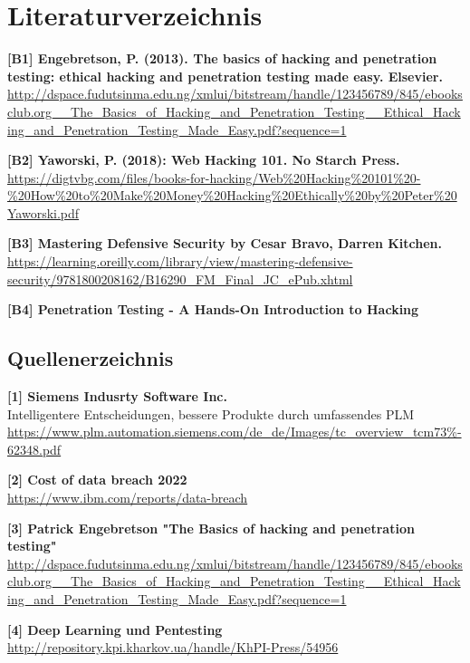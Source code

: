 \chapter{Literaturverzeichnis}

	\textbf{[B1] Engebretson, P. (2013).
	The basics of hacking and penetration testing: ethical hacking and penetration testing made easy. Elsevier.} \\
	\url{http://dspace.fudutsinma.edu.ng/xmlui/bitstream/handle/123456789/845/ebooksclub.org__The_Basics_of_Hacking_and_Penetration_Testing__Ethical_Hacking_and_Penetration_Testing_Made_Easy.pdf?sequence=1}
	
	
	\textbf{[B2] Yaworski, P. (2018): Web Hacking 101. No Starch Press.} \\
	\url{https://digtvbg.com/files/books-for-hacking/Web%20Hacking%20101%20-%20How%20to%20Make%20Money%20Hacking%20Ethically%20by%20Peter%20Yaworski.pdf}
	
	\textbf{[B3] Mastering Defensive Security by Cesar Bravo, Darren Kitchen.} \\
	\url{https://learning.oreilly.com/library/view/mastering-defensive-security/9781800208162/B16290_FM_Final_JC_ePub.xhtml}
	
	\textbf{[B4] Penetration Testing - A Hands-On Introduction to Hacking}
	


\section{Quellenerzeichnis}

	\textbf{[1] Siemens Indusrty Software Inc.} \\
	Intelligentere Entscheidungen, bessere Produkte durch umfassendes PLM \\
	\url{https://www.plm.automation.siemens.com/de_de/Images/tc_overview_tcm73%-62348.pdf}
	
	\textbf{[2] Cost of data breach 2022} \\
	\url{https://www.ibm.com/reports/data-breach}
	
	\textbf{[3] Patrick Engebretson "The Basics of hacking
		and penetration testing"} \\
	\url{http://dspace.fudutsinma.edu.ng/xmlui/bitstream/handle/123456789/845/ebooksclub.org__The_Basics_of_Hacking_and_Penetration_Testing__Ethical_Hacking_and_Penetration_Testing_Made_Easy.pdf?sequence=1}
	
	\textbf{[4] Deep Learning und Pentesting} \\
	\url{http://repository.kpi.kharkov.ua/handle/KhPI-Press/54956}
	
